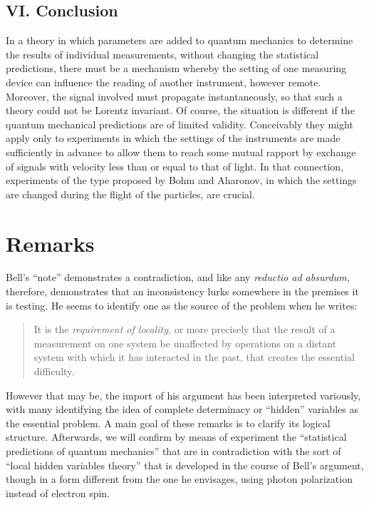 \subsection*{VI. Conclusion}
In a theory in which parameters are added to quantum mechanics to determine the results of individual
measurements, without changing the statistical predictions, there must be a mechanism whereby the setting
of one measuring device can influence the reading of another instrument, however remote. Moreover,
the signal involved must propagate instantaneously, so that such a theory could not be Lorentz invariant.
Of course, the situation is different if the quantum mechanical predictions are of limited validity.
Conceivably they might apply only to experiments in which the settings of the instruments are made sufficiently
in advance to allow them to reach some mutual rapport by exchange of signals with velocity less
than or equal to that of light. In that connection, experiments of the type proposed by Bohm and Aharonov, in which the settings are changed during the flight of the particles, are crucial.

\section*{Remarks}

Bell's ``note'' demonstrates a contradiction, and like any \emph{reductio ad absurdum,} therefore, 
demonstrates that an inconsistency lurks somewhere in the premises it is testing. He seems to
identify one as the source of the problem when he writes: 
\begin{quote}
It is the \emph{requirement of locality}, or more precisely that the result of a measurement on one system be unaffected by operations on a distant system with which it has interacted in the past, that creates the essential difficulty.
\end{quote}
However that may be, the import of his argument has been interpreted variously, with many identifying the idea of complete determinacy or ``hidden'' variables as the essential problem. A main goal of these remarks is to clarify its logical structure. Afterwards, we will confirm by means of experiment the ``statistical predictions of quantum mechanics'' that are in contradiction with the sort of ``local hidden variables theory'' that is developed in the course of Bell's argument, though in a form different from the one he envisages, using photon polarization instead of electron spin.

